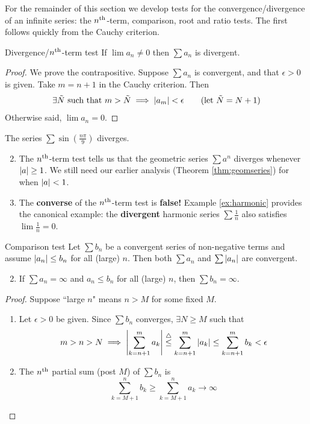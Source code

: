 \goodbreak



For the remainder of this section we develop tests for the convergence/divergence of an infinite series: the $n\textsuperscript{th}$-term, comparison, root and ratio tests. The first follows quickly from the Cauchy criterion.

\begin{thm}{Divergence/$n\textsuperscript{th}$-term test}{}
	If $\lim a_n\neq 0$ then $\sum a_n$ is divergent.
\end{thm}

\begin{proof}
	We prove the contrapositive. Suppose $\sum a_n$ is convergent, and that $\epsilon>0$ is given. Take $m=n+1$ in the Cauchy criterion. Then
	\[
		\exists \tilde N \text{ such that }m>\tilde N\implies\left| a_{m}\right|<\epsilon \tag{let $\tilde N=N+1$}
	\]
	Otherwise said, $\lim a_n=0$.
\end{proof}


\begin{examples}{}{}
	\exstart The series $\sum\sin(\frac{n\pi}9)$ diverges.
	\begin{enumerate}\setcounter{enumi}{1} 
	  \item The $n\textsuperscript{th}$-term test tells us that the geometric series $\sum a^n$ diverges whenever $\left| a\right|\ge 1$. We still need our earlier analysis (Theorem \ref{thm:geomseries}) for when $\left| a\right|<1$.
	  \item The \textbf{converse} of the $n\textsuperscript{th}$-term test is \textbf{false!} Example \ref{ex:harmonic} provides the canonical example: the \textbf{divergent} harmonic series $\sum \frac 1n$ also satisfies $\lim\frac 1n=0$.
	\end{enumerate}
\end{examples}


\begin{thm}{Comparison test}{}
	\exstart Let $\sum b_n$ be a convergent series of non-negative terms and assume $\left| a_n\right|\le b_n$ for all (large) $n$. Then both $\sum a_n$ and $\sum \left| a_n\right|$ are convergent.
	\begin{enumerate}\setcounter{enumi}{1}
	  \item If $\sum a_n=\infty$ and $a_n\le b_n$ for all (large) $n$, then $\sum b_n=\infty$.
	\end{enumerate}
\end{thm}

\begin{proof}
	Suppose ``large $n$" means $n>M$ for some fixed $M$. 
	\begin{enumerate}
	  \item Let $\epsilon>0$ be given. Since $\sum b_n$ converges, $\exists N\ge M$ such that
		\[
			m>n>N\implies\left| \sum_{k=n+1}^ma_k\right|
			\overset{\triangle}{\le}
			\sum_{k=n+1}^m\left| a_k\right|\le\sum_{k=n+1}^mb_k
			<\epsilon
		\]
		\item The $n\textsuperscript{th}$ partial sum (post $M$) of $\sum b_n$ is
		\[
			\sum_{k=M+1}^nb_k\ge \sum_{k=M+1}^na_k\to \infty \tag*{\qedhere}
		\]
	\end{enumerate}
\end{proof}

